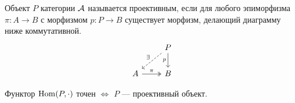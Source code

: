 \documentclass[../main.tex]{subfiles}
\begin{document}
\begin{to_def}
Объект $P$ категории $\mathcal{A}$ называется проективным, если для любого эпиморфизма $\pi: A\to B$ с морфизмом $p:P\to B$ существует морфизм, делающий диаграмму ниже коммутативной.
\begin{equation}\label{projective_def_diagram}
\begin{tikzcd}
	& P \\
	A & B
	\arrow["\pi", two heads, from=2-1, to=2-2]
	\arrow["p"', from=1-2, to=2-2]
	\arrow["\exists"', dashed, from=1-2, to=2-1]
\end{tikzcd}
\end{equation}
\end{to_def}
\begin{to_suj}\label{home_exact_proj}
Функтор $\operatorname{Hom}(P, \cdot)$ точен $\iff$ $P$ --- проективный объект.
\end{to_suj}
\end{document}
